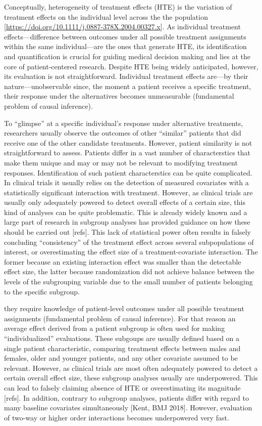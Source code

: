\documentclass[
]{book}
\begin{document}
Conceptually, heterogeneity of treatment effects (HTE) is the variation of
treatment effects on the individual level across the the population
{[}\url{https://doi.org/10.1111/j.0887-378X.2004.00327.x}{]}. As individual treatment
effects---difference between outcomes under all possible treatment assignments
within the same individual---are the ones that generate HTE, its identification
and quantification is crucial for guiding medical decision making and lies at
the core of patient-centered research. Despite HTE being widely anticipated,
however, its evaluation is not straightforward. Individual treatment effects
are---by their nature---unobservable since, the moment a patient receives a
specific treatment, their response under the alternatives becomes unmeasurable
(fundamental problem of causal inference).

To ``glimpse'' at a specific individual's response under alternative treatments,
researchers usually observe the outcomes of other ``similar'' patients that did
receive one of the other candidate treatments. However, patient similarity is
not straightforward to assess. Patients differ in a vast number of
characterstics that make them unique and may or may not be relevant to modifying
treatment responses. Identification of such patient characterstics can be quite
complicated. In clinical trials it usually relies on the detection of measured
covariates with a statistically significant interaction with treatment. However,
as clinical trials are usually only adequately powered to detect overall effects
of a certain size, this kind of analyses can be quite problematic. This is
already widely known and a large part of research in subgroup analyses has
provided guidance on how these should be carried out {[}refs{]}. This lack of
statistical power often results in falsely concluding ``consistency'' of the
treatment effect across several subpopulations of interest, or overestimating
the effect size of a treatment-covariate interaction. The former because an
existing interaction effect was smaller than the detectable effect size, the
latter because randomization did not achieve balance between the levels of the
subgrouping variable due to the small number of patients belonging to the
specific subgroup.

they require
knowledge of patient-level outcomes under all possible treatment assignments
(fundamental problem of causal inference). For that reason an average effect
derived from a patient subgroup is often used for making ``individualized''
evaluations. These subgoups are usually defined based on a single patient
characteristic, comparing treatment effects between males and females, older and
younger patients, and any other covariate assumed to be relevant. However, as
clinical trials are most often adequately powered to detect a certain overall
effect size, these subgroup analyses usually are underpowered. This can lead to
falsely claiming absence of HTE or overestimating its magnitude {[}refs{]}. In
addition, contrary to subgroup analyses, patients differ with regard to many
baseline covariates simultaneously {[}Kent, BMJ 2018{]}. However, evaluation of
two-way or higher order interactions becomes underpowered very fast.
\end{document}
